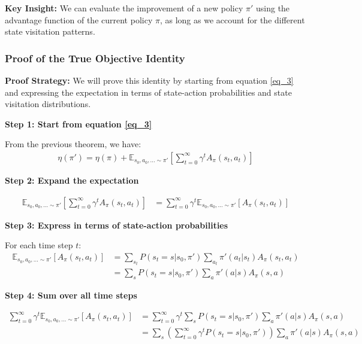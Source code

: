 \textbf{Key Insight:}
We can evaluate the improvement of a new policy $\pi'$ using the advantage function of the current policy $\pi$, as long as we account for the different state visitation patterns.

\subsubsection{Proof of the True Objective Identity}

\textbf{Proof Strategy:}
We will prove this identity by starting from equation \ref{eq_3} and expressing the expectation in terms of state-action probabilities and state visitation distributions.

\textbf{Step 1: Start from equation \ref{eq_3}}

From the previous theorem, we have:
\begin{align}
\eta(\pi') = \eta(\pi) + \mathbb{E}_{s_{0}, a_{0}, \ldots \sim \pi'} \left[ \sum_{t = 0}^{\infty} \gamma^t A_\pi(s_t, a_t) \right]
\end{align}

\textbf{Step 2: Expand the expectation}

\begin{align}
\mathbb{E}_{s_{0}, a_{0}, \ldots \sim \pi'} \left[ \sum_{t = 0}^{\infty} \gamma^t A_\pi(s_t, a_t) \right] &= \sum_{t = 0}^{\infty} \gamma^t \mathbb{E}_{s_{0}, a_{0}, \ldots \sim \pi'} [A_\pi(s_t, a_t)]
\end{align}

\textbf{Step 3: Express in terms of state-action probabilities}

For each time step $t$:
\begin{align}
\mathbb{E}_{s_{0}, a_{0}, \ldots \sim \pi'} [A_\pi(s_t, a_t)] &= \sum_{s_t} P(s_t = s | s_0, \pi') \sum_{a_t} \pi'(a_t | s_t) A_\pi(s_t, a_t) \\
&= \sum_{s} P(s_t = s | s_0, \pi') \sum_{a} \pi'(a | s) A_\pi(s, a)
\end{align}

\textbf{Step 4: Sum over all time steps}

\begin{align}
\sum_{t = 0}^{\infty} \gamma^t \mathbb{E}_{s_{0}, a_{0}, \ldots \sim \pi'} [A_\pi(s_t, a_t)] &= \sum_{t = 0}^{\infty} \gamma^t \sum_{s} P(s_t = s | s_0, \pi') \sum_{a} \pi'(a | s) A_\pi(s, a) \\
&= \sum_{s} \left( \sum_{t = 0}^{\infty} \gamma^t P(s_t = s | s_0, \pi') \right) \sum_{a} \pi'(a | s) A_\pi(s, a)
\end{align}

